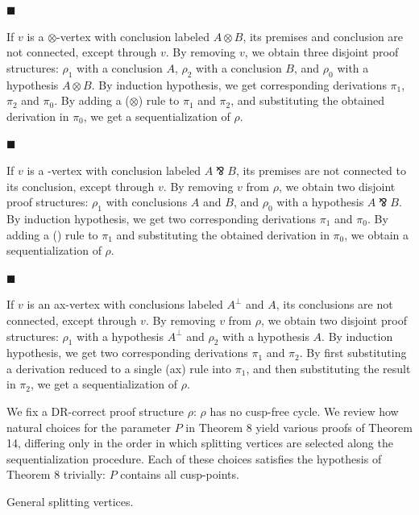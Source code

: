 \par\noindent  $\blacksquare$ 
 
If $v$ is a $\otimes$-vertex with conclusion labeled $A\otimes B$, its premises and conclusion are not connected, except through $v$. By removing $v$, we obtain three disjoint proof structures: $\rho_{1}$ with a conclusion $A$, $\rho_{2}$ with a conclusion $B$, and $\rho_{0}$ with a hypothesis $A\otimes B$. By induction hypothesis, we get corresponding derivations $\pi_{1}$, $\pi_{2}$ and $\pi_{0}$. By adding a ($\otimes$) rule to $\pi_{1}$ and $\pi_{2}$, and substituting the obtained derivation in $\pi_{0}$, we get a sequentialization of $\rho$.\par
 
 
 
\par\noindent  $\blacksquare$ 
 
If $v$ is a -vertex with conclusion labeled $A\invamp B$, its premises are not connected to its conclusion, except through $v$. By removing $v$ from $\rho$, we obtain two disjoint proof structures: $\rho_{1}$ with conclusions $A$ and $B$, and $\rho_{0}$ with a hypothesis $A\invamp B$. By induction hypothesis, we get two corresponding derivations $\pi_{1}$ and $\pi_{0}$. By adding a () rule to $\pi_{1}$ and substituting the obtained derivation in $\pi_{0}$, we obtain a sequentialization of $\rho$.\par
 
 
 
\par\noindent  $\blacksquare$ 
 
If $v$ is an ax-vertex with conclusions labeled $A^{\perp}$ and $A$, its conclusions are not connected, except through $v$. By removing $v$ from $\rho$, we obtain two disjoint proof structures: $\rho_{1}$ with a hypothesis $A^{\perp}$ and $\rho_{2}$ with a hypothesis $A$. By induction hypothesis, we get two corresponding derivations $\pi_{1}$ and $\pi_{2}$. By first substituting a derivation reduced to a single (ax) rule into $\pi_{1}$, and then substituting the result in $\pi_{2}$, we get a sequentialization of $\rho$.\par
 
 
  
 
 
We fix a DR-correct proof structure $\rho$: $\rho$ has no cusp-free cycle. We review how natural choices for the parameter $P$ in Theorem 8 yield various proofs of Theorem 14, differing only in the order in which splitting vertices are selected along the sequentialization procedure. Each of these choices satisfies the hypothesis of Theorem 8 trivially: $P$ contains all cusp-points.\par
  General splitting vertices.  
 
